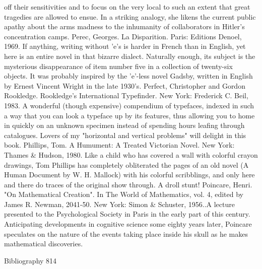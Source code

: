   off their sensitivities and to focus on the very local to such an extent that great tragedies are
  allowed to ensue. In a striking analogy, she likens the current public apathy about the arms
  madness to the inhumanity of collaborators in Hitler's concentration camps.
Perec, Georges. La Disparition. Paris: Editions Denoel, 1969. If anything, writing without 'e's
  is harder in French than in English, yet here is an entire novel in that bizarre dialect.
  Naturally enough, its subject is the mysterious disappearance of item number five in a
  collection of twenty-six objects. It was probably inspired by the 'e'-less novel Gadsby,
  written in English by Ernest Vincent Wright in the late 1930's.
Perfect, Christopher and Gordon Rookledge. Rookledge's International Typefinder. New
  York: Frederick C. Beil, 1983. A wonderful (though expensive) compendium of typefaces,
  indexed in such a way that you can look a typeface up by its features, thus allowing you to
  home in quickly on an unknown specimen instead of spending hours leafing through
  catalogues. Lovers of my "horizontal and vertical problems" will delight in this book.
Phillips, Tom. A Humument: A Treated Victorian Novel. New York: Thames \& Hudson,
  1980. Like a child who has covered a wall with colorful crayon drawings, Tom Phillips has
  completely obliterated the pages of an old novel (A Human Document by W. H. Mallock)
  with his colorful scribblings, and only here and there do traces of the original show through.
  A droll stunt!
Poincare, Henri. "On Mathematical Creation". In The World of Mathematics, vol. 4, edited by
  James R. Newman, 2041-50. New York: Simon \& Schuster, 1956..A lecture presented to
  the Psychological Society in Paris in the early part of this century. Anticipating
  developments in cognitive science some eighty years later, Poincare speculates on the
  nature of the events taking place inside his skull as he makes mathematical discoveries.

Bibliography                                                                                  814

